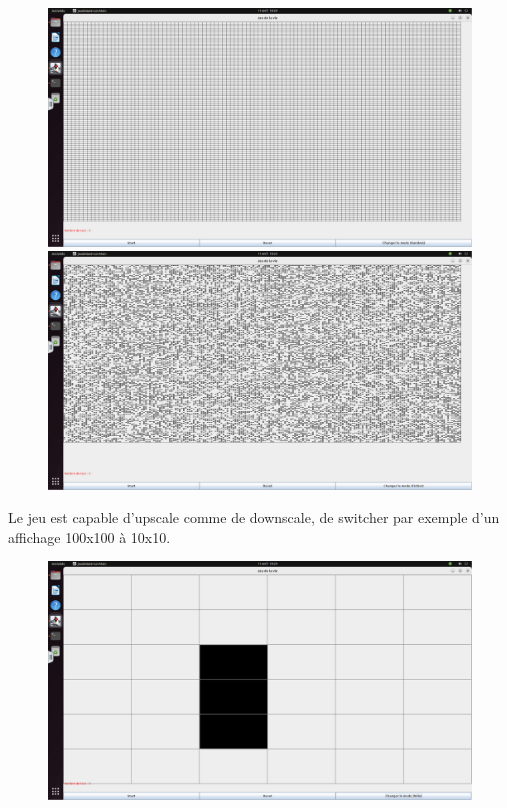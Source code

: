 \begin{figure}
\begin{center}

    \includegraphics[width=120mm,scale=0.5]{figures/click_mode.png}

    \includegraphics[width=120mm,scale=0.5]{figures/mode_random.png}
\end{center}
\end{figure}

    Le jeu est capable d'upscale comme de downscale, de switcher par exemple d'un affichage 100x100 à 10x10.
    \begin{figure}


\begin{center}
        \includegraphics[width=120mm,scale=0.5]{figures/mode_file.png}
\end{center}
\end{figure}
    
